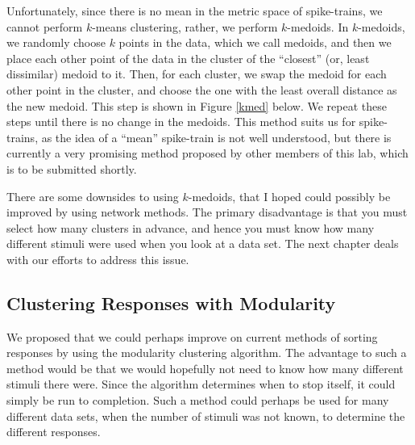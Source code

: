 Unfortunately, since there is no mean in the metric space of spike-trains, we 
cannot perform $k$-means clustering, rather, we perform $k$-medoids.  In 
$k$-medoids, we randomly choose $k$ points in the data, which we call medoids, 
and then we place each other point of the data in the cluster of the 
``closest'' (or, least dissimilar) medoid to it.  Then, for each cluster, we 
swap the medoid for each other point in the cluster, and choose the one with 
the least overall distance as the new medoid. This step is shown in Figure 
\ref{kmed} below. We repeat these steps until there is no change in the 
medoids.  This method suits us for spike-trains, as the idea of a ``mean'' 
spike-train is not well understood, but there is currently a very promising 
method proposed by other members of this lab, which is to be submitted shortly.

There are some downsides to using $k$-medoids, that I hoped could possibly be 
improved by using network methods.  The primary disadvantage is that you must 
select how many clusters in advance, and hence you must know how many different 
stimuli were used when you look at a data set.  The next chapter deals with our 
efforts to address this issue.


\subsection{Clustering Responses with Modularity}


We proposed that we could perhaps improve on current methods of sorting 
responses by using the modularity clustering algorithm.  The advantage to such 
a method would be that we would hopefully not need to know how many different 
stimuli there were. Since the algorithm determines when to stop itself, it 
could simply be run to completion.  Such a method could perhaps be used for 
many different data sets, when the number of stimuli was not known, to 
determine the different responses.

